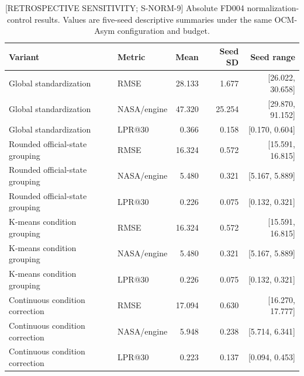 \begin{table}[!t]
\centering
\scriptsize
\caption{[RETROSPECTIVE SENSITIVITY; S-NORM-9] Absolute FD004 normalization-control results. Values are five-seed descriptive summaries under the same OCM-Asym configuration and budget.}
\label{tab:condition-normalization-absolute}
\begin{tabular}{llrrr}
\toprule
Variant & Metric & Mean & Seed SD & Seed range \\
\midrule
Global standardization & RMSE & 28.133 & 1.677 & [26.022, 30.658] \\
Global standardization & NASA/engine & 47.320 & 25.254 & [29.870, 91.152] \\
Global standardization & LPR@30 & 0.366 & 0.158 & [0.170, 0.604] \\
Rounded official-state grouping & RMSE & 16.324 & 0.572 & [15.591, 16.815] \\
Rounded official-state grouping & NASA/engine & 5.480 & 0.321 & [5.167, 5.889] \\
Rounded official-state grouping & LPR@30 & 0.226 & 0.075 & [0.132, 0.321] \\
K-means condition grouping & RMSE & 16.324 & 0.572 & [15.591, 16.815] \\
K-means condition grouping & NASA/engine & 5.480 & 0.321 & [5.167, 5.889] \\
K-means condition grouping & LPR@30 & 0.226 & 0.075 & [0.132, 0.321] \\
Continuous condition correction & RMSE & 17.094 & 0.630 & [16.270, 17.777] \\
Continuous condition correction & NASA/engine & 5.948 & 0.238 & [5.714, 6.341] \\
Continuous condition correction & LPR@30 & 0.223 & 0.137 & [0.094, 0.453] \\
\bottomrule
\end{tabular}
\end{table}
